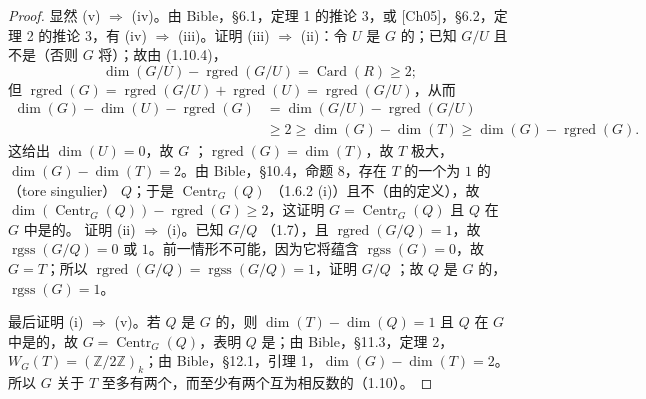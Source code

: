\begin{proof}
显然 (v) $\Rightarrow$ (iv)。由 Bible，\S 6.1，定理 1 的推论 3，或 [Ch05]，\S 6.2，定理 2 的推论 3，有 (iv) $\Rightarrow$ (iii)。证明 (iii) $\Rightarrow$ (ii)：令 $U$ 是 $G$ 的；已知 $G/U$ 且不是（否则 $G$ 将）；故由 (1.10.4)，
\[
\dim(G/U)-\operatorname{rgred}(G/U)=\operatorname{Card}(R)\ge2;
\]
但 $\operatorname{rgred}(G)=\operatorname{rgred}(G/U)+\operatorname{rgred}(U)=\operatorname{rgred}(G/U)$，从而
\begin{align*}
\dim(G)-\dim(U)-\operatorname{rgred}(G)
&=\dim(G/U)-\operatorname{rgred}(G/U)\\
&\ge2\ge\dim(G)-\dim(T)\ge\dim(G)-\operatorname{rgred}(G).
\end{align*}
这给出 $\dim(U)=0$，故 $G$ ；$\operatorname{rgred}(G)=\dim(T)$，故 $T$ 极大，$\dim(G)-\dim(T)=2$。由 Bible，\S 10.4，命题 8，存在 $T$ 的一个为 $1$ 的（tore singulier） $Q$；于是 $\operatorname{Centr}_G(Q)$ （1.6.2 (i)）且不（由的定义），故 $\dim(\operatorname{Centr}_G(Q))-\operatorname{rgred}(G)\ge2$，这证明 $G=\operatorname{Centr}_G(Q)$ 且 $Q$ 在 $G$ 中是的。
证明 (ii) $\Rightarrow$ (i)。已知 $G/Q$ （1.7），且 $\operatorname{rgred}(G/Q)=1$，故 $\operatorname{rgss}(G/Q)=0$ 或 $1$。前一情形不可能，因为它将蕴含 $\operatorname{rgss}(G)=0$，故 $G=T$；所以 $\operatorname{rgred}(G/Q)=\operatorname{rgss}(G/Q)=1$，证明 $G/Q$ ；故 $Q$ 是 $G$ 的，$\operatorname{rgss}(G)=1$。

最后证明 (i) $\Rightarrow$ (v)。若 $Q$ 是 $G$ 的，则 $\dim(T)-\dim(Q)=1$ 且 $Q$ 在 $G$ 中是的，故 $G=\operatorname{Centr}_G(Q)$，表明 $Q$ 是；由 Bible，\S 11.3，定理 2，$W_G(T)=(\mathbb Z/2\mathbb Z)_k$；由 Bible，\S 12.1，引理 1，$\dim(G)-\dim(T)=2$。所以 $G$ 关于 $T$ 至多有两个，而至少有两个互为相反数的（1.10）。
\end{proof}
